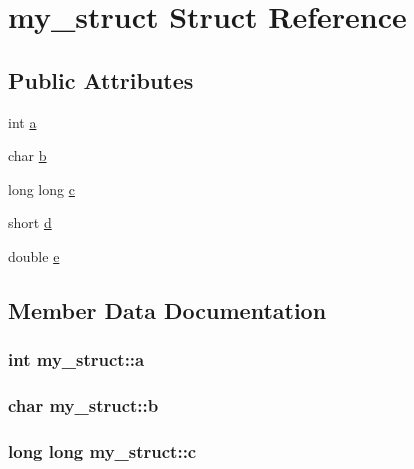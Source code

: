 \hypertarget{structmy__struct}{}\section{my\+\_\+struct Struct Reference}
\label{structmy__struct}
\subsection*{Public Attributes}
\begin{DoxyCompactItemize}
\item 
int \hyperlink{structmy__struct_a94e3d69234846926bb795bcab0b6c1b5}{a}
\item 
char \hyperlink{structmy__struct_a6646d8baf02dae8bdd8411babb3a4ebc}{b}
\item 
long long \hyperlink{structmy__struct_a9180ae117677bb68283a25c4c8d825e5}{c}
\item 
short \hyperlink{structmy__struct_a070f65ff028122289f47c2614f29092d}{d}
\item 
double \hyperlink{structmy__struct_ac7cf32e3d2727484991537391c3c2f83}{e}
\end{DoxyCompactItemize}


\subsection{Member Data Documentation}
\subsubsection[{\texorpdfstring{a}{a}}]{\setlength{\rightskip}{0pt plus 5cm}int my\+\_\+struct\+::a}\hypertarget{structmy__struct_a94e3d69234846926bb795bcab0b6c1b5}{}\label{structmy__struct_a94e3d69234846926bb795bcab0b6c1b5}
\subsubsection[{\texorpdfstring{b}{b}}]{\setlength{\rightskip}{0pt plus 5cm}char my\+\_\+struct\+::b}\hypertarget{structmy__struct_a6646d8baf02dae8bdd8411babb3a4ebc}{}\label{structmy__struct_a6646d8baf02dae8bdd8411babb3a4ebc}
\subsubsection[{\texorpdfstring{c}{c}}]{\setlength{\rightskip}{0pt plus 5cm}long long my\+\_\+struct\+::c}\hypertarget{structmy__struct_a9180ae117677bb68283a25c4c8d825e5}{}\label{structmy__struct_a9180ae117677bb68283a25c4c8d825e5}
